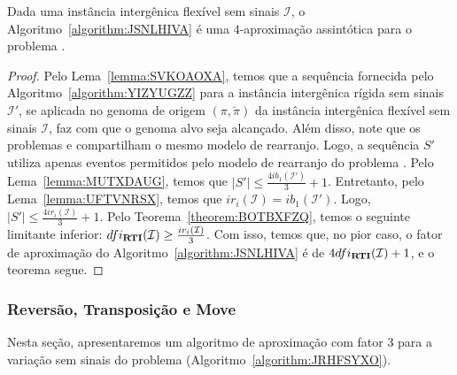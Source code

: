 \begin{theorem}\label{theorem:BBTWMULM}
Dada uma instância intergênica flexível sem sinais $\mathcal{I}$, o Algoritmo~\ref{algorithm:JSNLHIVA} é uma $4$-aproximação assintótica para o problema \SbFIRTI{}.
\end{theorem}
\begin{proof}
Pelo Lema~\ref{lemma:SVKOAOXA}, temos que a sequência fornecida pelo Algoritmo~\ref{algorithm:YIZYUGZZ} para a instância intergênica rígida sem sinais $\mathcal{I'}$, se aplicada no genoma de origem $(\pi,\breve\pi)$ da instância intergênica flexível sem sinais $\mathcal{I}$, faz com que o genoma alvo seja alcançado. Além disso, note que os problemas \SbIRTI{} e \SbFIRTI{} compartilham o mesmo modelo de rearranjo. Logo, a sequência $S'$ utiliza apenas eventos permitidos pelo modelo de rearranjo do problema \SbFIRTI{}. Pelo Lema~\ref{lemma:MUTXDAUG}, temos que $|S'| \le \frac{4ib_1(\mathcal{I}')}{3} + 1$. Entretanto, pelo Lema~\ref{lemma:UFTVNRSX}, temos que $ir_i(\mathcal{I}) = ib_1(\mathcal{I'})$. Logo, $|S'| \le \frac{4ir_i(\mathcal{I})}{3} + 1$. Pelo Teorema~\ref{theorem:BOTBXFZQ}, temos o seguinte limitante inferior: $dfi_{\textbf{RTI}}(\mathcal{I}) \ge \frac{ir_i(\mathcal{I})}{3}$. Com isso, temos que, no pior caso, o fator de aproximação do Algoritmo~\ref{algorithm:JSNLHIVA} é de $4dfi_{\textbf{RTI}}(\mathcal{I}) + 1$, e o teorema segue.
\end{proof}

\subsubsection{Reversão, Transposição e Move}

Nesta seção, apresentaremos um algoritmo de aproximação com fator $3$ para a variação sem sinais do problema \SbFIRTM{} (Algoritmo~\ref{algorithm:JRHFSYXO}).



